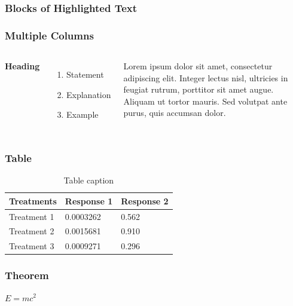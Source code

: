 \documentclass[french]{beamer}
\begin{document}
\begin{frame}
\frametitle{Blocks of Highlighted Text}





\end{frame}


\begin{frame}
\frametitle{Multiple Columns}
\begin{columns}[c] %

\textbf{Heading}
\begin{enumerate}
\item Statement
\item Explanation
\item Example
\end{enumerate}

Lorem ipsum dolor sit amet, consectetur adipiscing elit. Integer lectus nisl, ultricies in feugiat rutrum, porttitor sit amet augue. Aliquam ut tortor mauris. Sed volutpat ante purus, quis accumsan dolor.

\end{columns}
\end{frame}

\begin{frame}
\frametitle{Table}
\begin{table}
\begin{tabular}{l l l}
\toprule
\textbf{Treatments} & \textbf{Response 1} & \textbf{Response 2}\\
\midrule
Treatment 1 & 0.0003262 & 0.562 \\
Treatment 2 & 0.0015681 & 0.910 \\
Treatment 3 & 0.0009271 & 0.296 \\
\bottomrule
\end{tabular}
\caption{Table caption}
\end{table}
\end{frame}


\begin{frame}
\frametitle{Theorem}
\begin{theorem}
$E = mc^2$
\end{theorem}
\end{frame}
\end{document}
